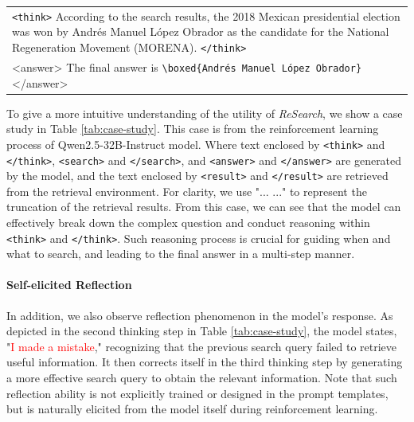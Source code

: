 \documentclass{article}
\newcommand{\thinkrow}[1]{\rowcolor{blue!10} \texttt{<think>} #1 \texttt{</think>} \\}
\begin{document}
\begin{table}[htbp]
\begin{center}
\begin{tabular}{p{}}
  \thinkrow{According to the search results, the 2018 Mexican presidential election was won by Andrés Manuel López Obrador as the candidate for the National Regeneration Movement (MORENA).}
  \rowcolor{yellow!10} <answer> The final answer is \verb|\boxed{Andrés Manuel López Obrador}| </answer> \\
  \bottomrule
  \end{tabular}
  \end{center}
  \end{table}

To give a more intuitive understanding of the utility of \textit{ReSearch}, we show a case study in Table \ref{tab:case-study}. This case is from the reinforcement learning process of Qwen2.5-32B-Instruct model.
Where text enclosed by \texttt{<think>} and \texttt{</think>}, \texttt{<search>} and \texttt{</search>}, and \texttt{<answer>} and \texttt{</answer>} are generated by the model, and the text enclosed by \texttt{<result>} and \texttt{</result>} are retrieved from the retrieval environment. 
For clarity, we use "... ..." to represent the truncation of the retrieval results.
From this case, we can see that the model can effectively break down the complex question and conduct reasoning within \texttt{<think>} and \texttt{</think>}. 
Such reasoning process is crucial for guiding when and what to search, and leading to the final answer in a multi-step manner.

\paragraph{Self-elicited Reflection}
In addition, we also observe reflection phenomenon in the model's response. 
As depicted in the second thinking step in Table \ref{tab:case-study}, the model states, "\textcolor{red}{I made a mistake}," recognizing that the previous search query failed to retrieve useful information. It then corrects itself in the third thinking step by generating a more effective search query to obtain the relevant information.
Note that such reflection ability is not explicitly trained or designed in the prompt templates, but is naturally elicited from the model itself during reinforcement learning.
\end{document}
